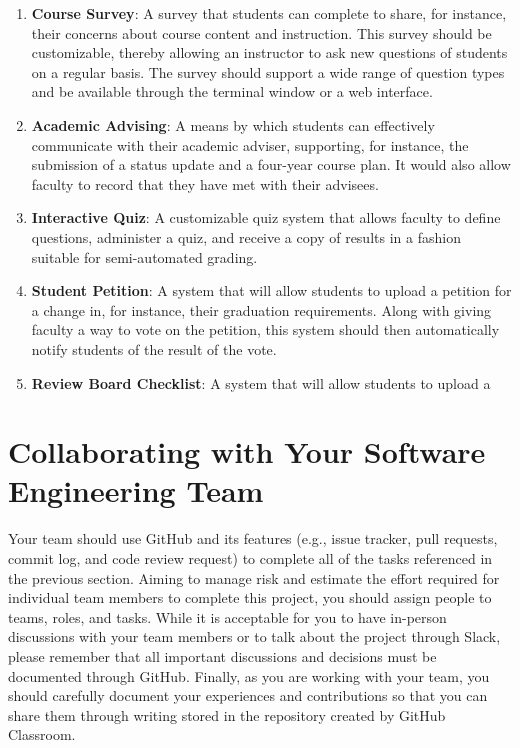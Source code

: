 \documentclass[11pt]{article}
\begin{document}
\begin{enumerate}
  \setlength{\itemsep}{0pt}

  \item {\bf Course Survey}: A survey that students can complete to share, for
    instance, their concerns about course content and instruction. This survey
    should be customizable, thereby allowing an instructor to ask new questions
    of students on a regular basis. The survey should support a wide range of
    question types and be available through the terminal window or a web
    interface.

  \item {\bf Academic Advising}: A means by which students can effectively
    communicate with their academic adviser, supporting, for instance, the
    submission of a status update and a four-year course plan. It would also
    allow faculty to record that they have met with their advisees.

  \item {\bf Interactive Quiz}: A customizable quiz system that allows faculty
    to define questions, administer a quiz, and receive a copy of results in a
    fashion suitable for semi-automated grading.

  \item {\bf Student Petition}: A system that will allow students to upload a
    petition for a change in, for instance, their graduation requirements. Along
    with giving faculty a way to vote on the petition, this system should then
    automatically notify students of the result of the vote.

  \item {\bf Review Board Checklist}: A system that will allow students to upload a


\end{enumerate}

\section*{Collaborating with Your Software Engineering Team}

Your team should use GitHub and its features (e.g., issue tracker, pull
requests, commit log, and code review request) to complete all of the tasks
referenced in the previous section.
%
Aiming to manage risk and estimate the effort required for individual team
members to complete this project, you should assign people to teams, roles, and
tasks. While it is acceptable for you to have in-person discussions with your
team members or to talk about the project through Slack, please remember that
all important discussions and decisions must be documented through GitHub.
Finally, as you are working with your team, you should carefully document your
experiences and contributions so that you can share them through writing stored
in the repository created by GitHub Classroom.
\end{document}
